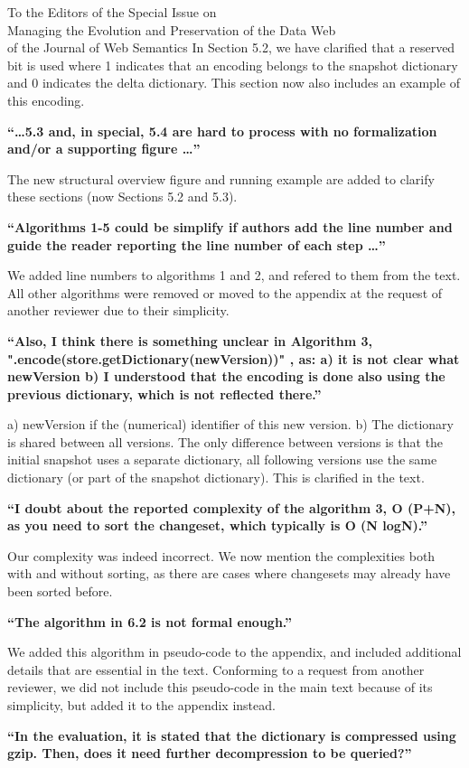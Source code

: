 \documentclass{letter}
\newcounter{section}
\begin{document}
\begin{letter}{To the Editors of the Special Issue on\\Managing the Evolution and Preservation of the Data Web\\of the Journal of Web Semantics}
In Section 5.2, we have clarified that a reserved bit is used where 1 indicates that an encoding
belongs to the snapshot dictionary and 0 indicates the delta dictionary.
This section now also includes an example of this encoding.

\textbf{\enquote{\ldots 5.3 and, in special, 5.4 are hard to process with no formalization and/or a supporting figure \ldots}}

The new structural overview figure and running example are added to clarify these sections (now Sections 5.2 and 5.3).

\textbf{\enquote{Algorithms 1-5 could be simplify if authors add the line number and guide the reader reporting the line number of each step \ldots}}

We added line numbers to algorithms 1 and 2, and refered to them from the text.
All other algorithms were removed or moved to the appendix at the request of another reviewer due to their simplicity.

\textbf{\enquote{Also, I think there is something unclear in Algorithm 3, ".encode(store.getDictionary(newVersion))" , as: a) it is not clear what newVersion b) I understood that the encoding is done also using the previous dictionary, which is not reflected there.}}

a) newVersion if the (numerical) identifier of this new version.
b) The dictionary is shared between all versions. The only difference between versions is that the initial snapshot uses a separate dictionary, all following versions use the same dictionary (or part of the snapshot dictionary).
This is clarified in the text.

\textbf{\enquote{I doubt about the reported complexity of the algorithm 3, O (P+N), as you need to sort the changeset, which typically is O (N logN).}}

Our complexity was indeed incorrect. We now mention the complexities both with and without sorting,
as there are cases where changesets may already have been sorted before.

\textbf{\enquote{The algorithm in 6.2 is not formal enough.}}

We added this algorithm in pseudo-code to the appendix,
and included additional details that are essential in the text.
Conforming to a request from another reviewer, we did not include this pseudo-code in the main text because of its simplicity,
but added it to the appendix instead.

\textbf{\enquote{In the evaluation, it is stated that the dictionary is compressed using gzip. Then, does it need further decompression to be queried?}}


\end{letter}
\end{document}
